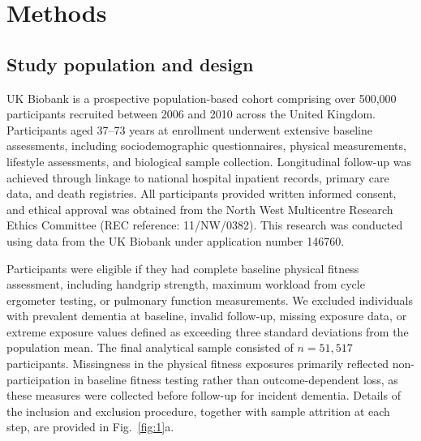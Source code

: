 \documentclass{article}
\begin{document}
\section*{Methods}

\subsection*{Study population and design}

UK Biobank is a prospective population-based cohort comprising over 500,000 participants recruited between 2006 and 2010 across the United Kingdom. Participants aged 37--73 years at enrollment underwent extensive baseline assessments, including sociodemographic questionnaires, physical measurements, lifestyle assessments, and biological sample collection. Longitudinal follow-up was achieved through linkage to national hospital inpatient records, primary care data, and death registries. All participants provided written informed consent, and ethical approval was obtained from the North West Multicentre Research Ethics Committee (REC reference: 11/NW/0382). This research was conducted using data from the UK Biobank under application number 146760.

Participants were eligible if they had complete baseline physical fitness assessment, including handgrip strength, maximum workload from cycle ergometer testing, or pulmonary function measurements. We excluded individuals with prevalent dementia at baseline, invalid follow-up, missing exposure data, or extreme exposure values defined as exceeding three standard deviations from the population mean. The final analytical sample consisted of $n = 51{,}517$ participants. Missingness in the physical fitness exposures primarily reflected non-participation in baseline fitness testing rather than outcome-dependent loss, as these measures were collected before follow-up for incident dementia. Details of the inclusion and exclusion procedure, together with sample attrition at each step, are provided in Fig.~\ref{fig:1}a.
\end{document}
